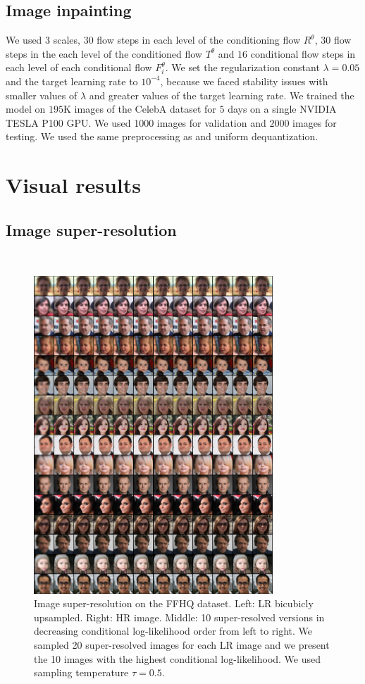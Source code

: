 \subsection{Image inpainting}
We used $3$ scales, $30$ flow steps in each level of the conditioning flow $R^\theta$, $30$ flow steps in the each level of the conditioned flow $T^\theta$ and $16$ conditional flow steps in each level of each conditional flow $F_i^{\theta}$. We set the regularization constant $\lambda = 0.05$ and the target learning rate to $10^{-4}$, because we faced stability issues with smaller values of $\lambda$ and greater values of the target learning rate. We trained the model on $195$K images of the CelebA dataset for $5$ days on a single NVIDIA TESLA P100 GPU. We used 1000 images for validation and $2000$ images for testing. We used the same preprocessing as  \cite{cGLOW} and uniform dequantization.

\clearpage
\section{Visual results}\label{ch1:sec:extended-visual-results} %
\subsection{Image super-resolution}\ 

\begin{figure}[h!]
    \centering
    \includegraphics[width=0.8\textwidth]{Chapter1/paper_graphs/SupplementaryMaterial/ffhq_superresolved_2_0.5_cropped.png}
    \caption{Image super-resolution on the FFHQ dataset. Left: LR bicubicly upsampled. Right: HR image. Middle: 10 super-resolved versions in decreasing conditional log-likelihood order from left to right. We sampled 20 super-resolved images for each LR image and we present the 10 images with the highest conditional log-likelihood. We used sampling temperature $\tau=0.5$.}
\end{figure}

